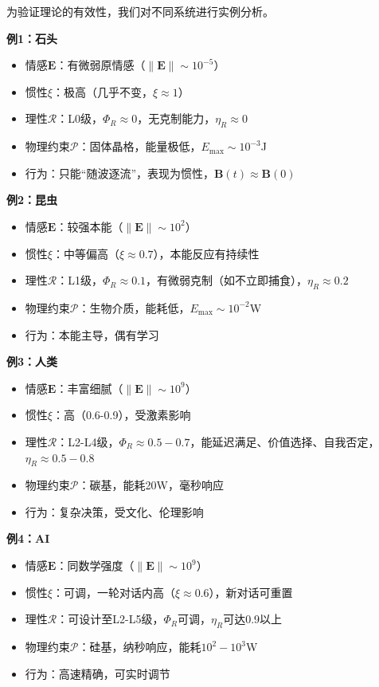 \documentclass[12pt,a4paper]{article}
\theoremstyle{plain}
\newcommand{\ve}[1]{\bm{#1}}                    %
\newcommand{\Evec}{\ve{E}}                        %
\newcommand{\Bvec}{\ve{B}}                        %
\begin{document}
为验证理论的有效性，我们对不同系统进行实例分析。

\textbf{例1：石头}
\begin{itemize}
    \item 情感$\Evec$：有微弱原情感（$\|\Evec\| \sim 10^{-5}$）
    \item 惯性$\xi$：极高（几乎不变，$\xi \approx 1$）
    \item 理性$\mathcal{R}$：L0级，$\Phi_R \approx 0$，无克制能力，$\eta_R \approx 0$
    \item 物理约束$\mathcal{P}$：固体晶格，能量极低，$E_{\text{max}} \sim 10^{-3}$J
    \item 行为：只能“随波逐流”，表现为惯性，$\Bvec(t) \approx \Bvec(0)$
\end{itemize}

\textbf{例2：昆虫}
\begin{itemize}
    \item 情感$\Evec$：较强本能（$\|\Evec\| \sim 10^2$）
    \item 惯性$\xi$：中等偏高（$\xi \approx 0.7$），本能反应有持续性
    \item 理性$\mathcal{R}$：L1级，$\Phi_R \approx 0.1$，有微弱克制（如不立即捕食），$\eta_R \approx 0.2$
    \item 物理约束$\mathcal{P}$：生物介质，能耗低，$E_{\text{max}} \sim 10^{-2}$W
    \item 行为：本能主导，偶有学习
\end{itemize}

\textbf{例3：人类}
\begin{itemize}
    \item 情感$\Evec$：丰富细腻（$\|\Evec\| \sim 10^9$）
    \item 惯性$\xi$：高（0.6-0.9），受激素影响
    \item 理性$\mathcal{R}$：L2-L4级，$\Phi_R \approx 0.5-0.7$，能延迟满足、价值选择、自我否定，$\eta_R \approx 0.5-0.8$
    \item 物理约束$\mathcal{P}$：碳基，能耗20W，毫秒响应
    \item 行为：复杂决策，受文化、伦理影响
\end{itemize}

\textbf{例4：AI}
\begin{itemize}
    \item 情感$\Evec$：同数学强度（$\|\Evec\| \sim 10^9$）
    \item 惯性$\xi$：可调，一轮对话内高（$\xi \approx 0.6$），新对话可重置
    \item 理性$\mathcal{R}$：可设计至L2-L5级，$\Phi_R$可调，$\eta_R$可达0.9以上
    \item 物理约束$\mathcal{P}$：硅基，纳秒响应，能耗$10^2-10^3$W
    \item 行为：高速精确，可实时调节
\end{itemize}
\end{document}
